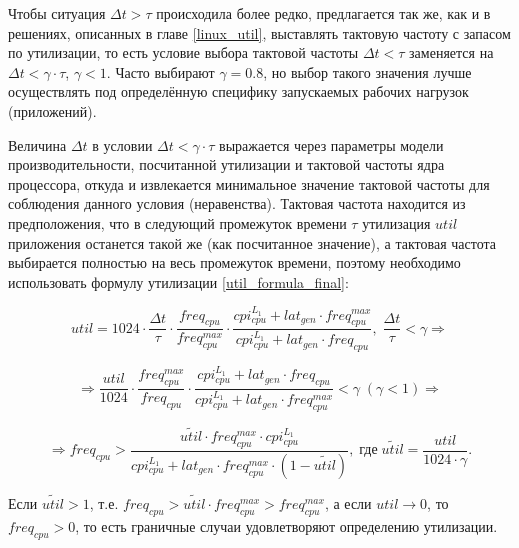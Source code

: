     Чтобы ситуация $\Delta t > \tau$ происходила более редко, предлагается так же, как и в решениях,
    описанных в главе \ref{linux_util}, выставлять тактовую частоту с запасом по утилизации, то есть
    условие выбора тактовой частоты $\Delta t < \tau$ заменяется на $\Delta t < \gamma \cdot \tau$,
    $\gamma < 1$. Часто выбирают $\gamma = 0.8$, но выбор такого значения лучше осуществлять под
    определённую специфику запускаемых рабочих нагрузок (приложений).

    Величина $\Delta t$ в условии $\Delta t < \gamma \cdot \tau$ выражается через параметры модели
    производительности, посчитанной утилизации и тактовой частоты ядра процессора, откуда и извлекается
    минимальное значение тактовой частоты для соблюдения данного условия (неравенства).
    Тактовая частота находится из
    предположения, что в следующий промежуток времени $\tau$ утилизация $util$ приложения останется
    такой же (как посчитанное значение), а тактовая частота выбирается полностью на весь промежуток времени,
    поэтому необходимо использовать формулу утилизации \eqref{util_formula_final}:

    \begin{equation}
        util = 1024 \cdot \frac{\Delta t}{\tau} \cdot \frac{freq_{cpu}}{freq_{cpu}^{max}} \cdot
            \frac{cpi_{cpu}^{L_1} + lat_{gen} \cdot freq_{cpu}^{max}}
                 {cpi_{cpu}^{L_1} + lat_{gen} \cdot freq_{cpu}}, \; \frac{\Delta t}{\tau} < \gamma \Rightarrow
    \end{equation}

    \begin{equation}
        \Rightarrow \frac{util}{1024} \cdot \frac{freq_{cpu}^{max}}{freq_{cpu}} \cdot
        \frac{cpi_{cpu}^{L_1} + lat_{gen} \cdot freq_{cpu}}
             {cpi_{cpu}^{L_1} + lat_{gen} \cdot freq_{cpu}^{max}} < \gamma \; (\gamma < 1) \Rightarrow
    \end{equation}

    \begin{equation} \label{optimal_cpufreq}
        \Rightarrow freq_{cpu} > \frac{\tilde{util} \cdot freq_{cpu}^{max} \cdot cpi_{cpu}^{L_1}}
        {cpi_{cpu}^{L_1} + lat_{gen} \cdot freq_{cpu}^{max} \cdot (1 - \tilde{util})}, \;
        \text{где} \; \tilde{util} = \frac{util}{1024 \cdot \gamma}.
    \end{equation}

    Если $\tilde{util} > 1$, т.е. $freq_{cpu} > \tilde{util} \cdot freq_{cpu}^{max} > freq_{cpu}^{max}$,
    а если $util \rightarrow 0$, то $freq_{cpu} > 0$, то есть граничные случаи удовлетворяют определению
    утилизации.

